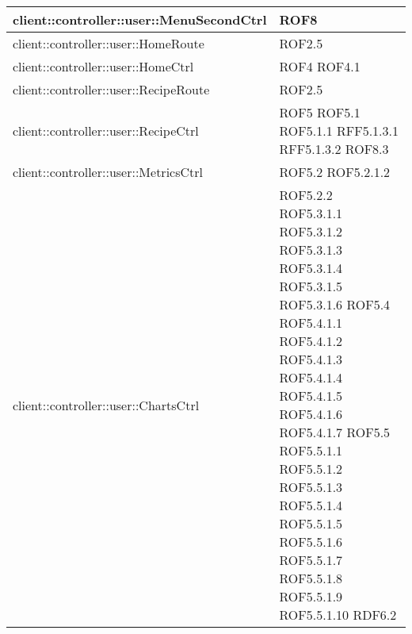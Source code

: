 \begin{center}
\begin{longtable}{| p{11cm} | p{2.5cm} |}
\hline
client::controller::user::MenuSecondCtrl & ROF8 \\
\hline
client::controller::user::HomeRoute & ROF2.5 \\
\hline
client::controller::user::HomeCtrl & ROF4 \newline ROF4.1 \\
\hline
client::controller::user::RecipeRoute & ROF2.5 \\
\hline
client::controller::user::RecipeCtrl & ROF5 \newline ROF5.1 \newline ROF5.1.1 \newline RFF5.1.3.1 \newline RFF5.1.3.2 \newline ROF8.3 \\
\hline
client::controller::user::MetricsCtrl & ROF5.2 \newline ROF5.2.1.2 \\
\hline
client::controller::user::ChartsCtrl & ROF5.2.2 \newline ROF5.3.1.1 \newline ROF5.3.1.2 \newline ROF5.3.1.3 \newline ROF5.3.1.4 \newline ROF5.3.1.5 \newline ROF5.3.1.6 \newline ROF5.4 \newline ROF5.4.1.1 \newline ROF5.4.1.2 \newline ROF5.4.1.3 \newline ROF5.4.1.4 \newline ROF5.4.1.5 \newline ROF5.4.1.6 \newline ROF5.4.1.7 \newline ROF5.5 \newline ROF5.5.1.1 \newline ROF5.5.1.2 \newline ROF5.5.1.3 \newline ROF5.5.1.4 \newline ROF5.5.1.5 \newline ROF5.5.1.6 \newline ROF5.5.1.7 \newline ROF5.5.1.8 \newline ROF5.5.1.9 \newline ROF5.5.1.10 \newline RDF6.2 \\

\end{longtable}
\end{center}
